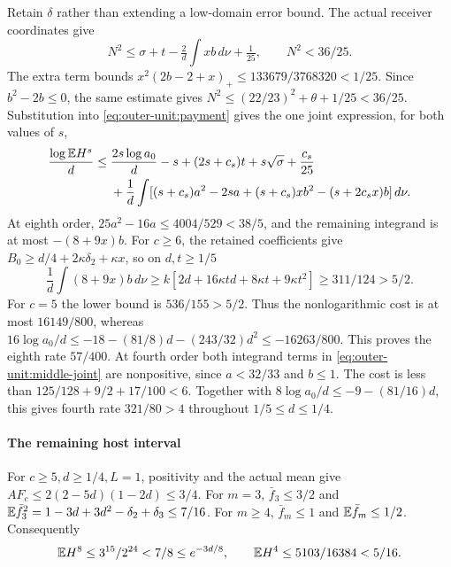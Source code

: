 Retain \(\delta\) rather than extending a low-domain error bound.
The actual receiver coordinates give
\begin{equation}\label{eq:outer-unit:middle-norm}
 N^2\le\sigma+t-\tfrac2d\int xb\,d\nu+\tfrac1{25},
 \qquad N^2<36/25.
\end{equation}
The extra term bounds
\(x^2(2b-2+x)_+\le133679/3768320<1/25\).
Since \(b^2-2b\le0\), the same estimate gives
\(N^2\le(22/23)^2+\theta+1/25<36/25\).
Substitution into \eqref{eq:outer-unit:payment} gives the one joint
expression, for both values of \(s\),
\begin{equation}\label{eq:outer-unit:middle-joint}
\begin{aligned}
 \frac{\log\mathbb E H^s}{d}\le{}&\frac{2s\log a_0}{d}-s+(2s+c_s)t
                  +s\sqrt\sigma+\frac{c_s}{25}\\
 &+\frac1d\int[(s+c_s)a^2-2sa+(s+c_s)xb^2
                                      -(s+2c_sx)b]\,d\nu.
\end{aligned}
\end{equation}
At eighth order, \(25a^2-16a\le4004/529<38/5\), and the
remaining integrand is at most \(-(8+9x)b\).
For \(c\ge6\), the retained coefficients give
\(B_0\ge d/4+2\kappa\delta_2+\kappa x\), so on \(d,t\ge1/5\)
\[
 \frac1d\int(8+9x)b\,d\nu
 \ge k[2d+16\kappa td+8\kappa t+9\kappa t^2]
 \ge311/124>5/2.
\]
For \(c=5\) the lower bound is \(536/155>5/2\).
Thus the nonlogarithmic cost is at most \(16149/800\), whereas
\(16\log a_0/d\le-18-(81/8)d-(243/32)d^2\le-16263/800\).
This proves the eighth rate \(57/400\).
At fourth order both integrand terms in
\eqref{eq:outer-unit:middle-joint} are nonpositive, since
\(a<32/33\) and \(b\le1\). The cost is less than
\(125/128+9/2+17/100<6\).
Together with \(8\log a_0/d\le-9-(81/16)d\), this gives fourth rate
\(321/80>4\) throughout \(1/5\le d\le1/4\).

\paragraph{The remaining host interval}
For \(c\ge5,d\ge1/4,L=1\), positivity and the actual mean give
\(AF_c\le2(2-5d)(1-2d)\le3/4\).
For \(m=3\), \(\bar f_3\le3/2\) and
\(\mathbb E\bar f_3^2=1-3d+3d^2-\delta_2+\delta_3\le7/16\).
For \(m\ge4\), \(\bar f_m\le1\) and \(\mathbb E\bar f_m\le1/2\).
Consequently
\begin{equation}\label{eq:outer-unit:high-unit}
 \mathbb E H^8\le3^{15}/2^{24}<7/8\le e^{-3d/8},\qquad
 \mathbb E H^4\le5103/16384<5/16.
\end{equation}

